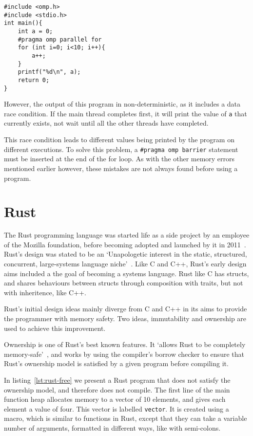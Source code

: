 \begin{code}
\begin{verbatim}
#include <omp.h>
#include <stdio.h>
int main(){
    int a = 0;
    #pragma omp parallel for
    for (int i=0; i<10; i++){
        a++;
    }
    printf("%d\n", a);
    return 0;
}
\end{verbatim}
\label{lst:omp-eg}
\end{code}

However, the output of this program in non-deterministic, as it includes a data race condition. If the main thread completes first, it will print the value of \texttt{a} that currently exists, not wait until all the other threads have completed. 

This race condition leads to different values being printed by the program on different executions. To solve this problem, a \texttt{\#pragma omp barrier} statement must be inserted at the end of the for loop. As with the other memory errors mentioned earlier however, these mistakes are not always found before using a program.

\section{Rust}\label{sec:rust}
The Rust programming language was started life as a side project by an employee of the Mozilla foundation, before becoming adopted and launched by it in 2011~\cite{FutureTense}. Rust's design was stated to be an `Unapologetic interest in the static, structured, concurrent, large-systems language niche'~\cite{pServo}. Like C and C++, Rust's early design aims included a the goal of becoming a systems language. Rust like C has structs, and shares behaviours between structs through composition with traits, but not with inheritence, like C++.

Rust's initial design ideas mainly diverge from C and C++ in its aims to provide the programmer with memory safety. Two ideas, immutability and ownership are used to achieve this improvement. 

Ownership is one of Rust's best known features. It `allows Rust to be completely memory-safe'~\cite{NomOwner}, and works by using the compiler's borrow checker to ensure that Rust's ownership model is satisfied by a given program before compiling it.

In listing~\ref{lst:rust-free} we present a Rust program that does not satisfy the ownership model, and therefore does not compile. The first line of the main function heap allocates memory to a vector of 10 elements, and gives each element a value of four. This vector is labelled \texttt{vector}. It is created using a macro, which is similar to functions in Rust, except that they can take a variable number of arguments, formatted in different ways, like with semi-colons.

